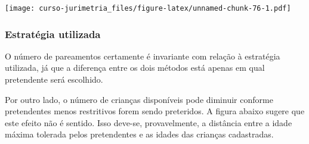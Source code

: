 \documentclass[]{book}
\newenvironment{Shaded}{\begin{snugshade}}{\end{snugshade}}
\newcommand{\KeywordTok}[1]{\textcolor[rgb]{0.13,0.29,0.53}{\textbf{{#1}}}}
\newcommand{\DataTypeTok}[1]{\textcolor[rgb]{0.13,0.29,0.53}{{#1}}}
\newcommand{\DecValTok}[1]{\textcolor[rgb]{0.00,0.00,0.81}{{#1}}}
\newcommand{\StringTok}[1]{\textcolor[rgb]{0.31,0.60,0.02}{{#1}}}
\newcommand{\NormalTok}[1]{{#1}}
\begin{document}
\texttt{[image: curso-jurimetria\_files/figure-latex/unnamed-chunk-76-1.pdf]}

\subsubsection{Estratégia utilizada}\label{estrategia-utilizada}

O número de pareamentos certamente é invariante com relação à estratégia
utilizada, já que a diferença entre os dois métodos está apenas em qual
pretendente será escolhido.

Por outro lado, o número de crianças disponíveis pode diminuir conforme
pretendentes menos restritivos forem sendo preteridos. A figura abaixo
sugere que este efeito não é sentido. Isso deve-se, provavelmente, a
distância entre a idade máxima tolerada pelos pretendentes e as idades
das crianças cadastradas.

\begin{Shaded}
\end{Shaded}
\end{document}
